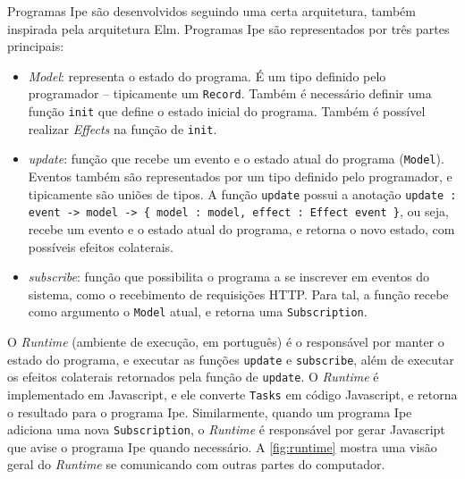 Programas Ipe são desenvolvidos seguindo uma certa arquitetura, também inspirada
pela arquitetura Elm. Programas Ipe são representados por três partes principais:

\begin{itemize}
    \item \textit{Model}: representa o estado do programa. É um tipo definido
          pelo programador -- tipicamente um \texttt{Record}. Também é necessário definir
          uma função \texttt{init} que define o estado inicial do programa. Também
          é possível realizar \textit{Effects} na função de \texttt{init}.
    \item \textit{update}: função que recebe um evento e o estado atual do programa
          (\texttt{Model}). Eventos também são representados por um tipo definido pelo
          programador, e tipicamente são uniões de tipos. A função \texttt{update} possui
          a anotação \texttt{update : event -> model -> \{ model : model, effect : Effect event \}},
          ou seja, recebe um evento e o estado atual do programa, e retorna o novo estado,
          com possíveis efeitos colaterais.
    \item \textit{subscribe}: função que possibilita o programa a se inscrever
          em eventos do sistema, como o recebimento de requisições HTTP. Para tal,
          a função recebe como argumento o \texttt{Model} atual, e retorna uma
          \texttt{Subscription}.
\end{itemize}

O \textit{Runtime} (ambiente de execução, em português) é o responsável por manter
o estado do programa, e executar as funções \texttt{update} e \texttt{subscribe},
além de executar os efeitos colaterais retornados pela função de \texttt{update}.
O \textit{Runtime} é implementado em Javascript, e ele converte \texttt{Tasks} em
código Javascript, e retorna o resultado para o programa Ipe.  Similarmente, quando
um programa Ipe adiciona uma nova \texttt{Subscription}, o \textit{Runtime} é
responsável por gerar Javascript que avise o programa Ipe quando necessário. A
\autoref{fig:runtime} mostra uma visão geral do \textit{Runtime} se comunicando
com outras partes do computador.


